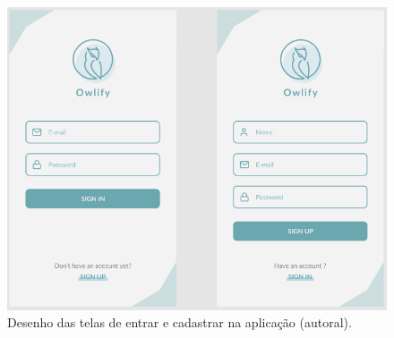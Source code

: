 \begin{figure}[H]
  \centering
  \includegraphics[width=.80\textwidth]{assets/example-app-screens.png} 
  \caption{Desenho das telas de entrar e cadastrar na aplicação (autoral).}
  \label{fig:app-screns-login} 
\end{figure}